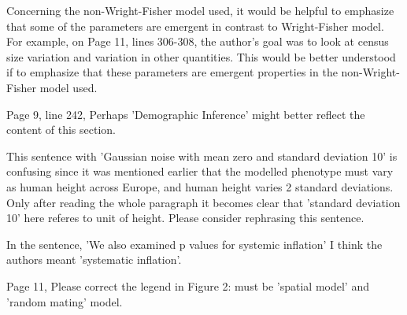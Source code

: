 \begin{point}{}
    Concerning the non-Wright-Fisher model used, it would be helpful to emphasize that some of the parameters are emergent in contrast to Wright-Fisher model. For example, on Page 11, lines 306-308, the author's goal was to look at census size variation and variation in other quantities. This would be better understood if to emphasize that these parameters are emergent properties in the non-Wright-Fisher model used.
\end{point}


\begin{point}{}
    Page 9, line 242, Perhaps 'Demographic Inference' might better reflect the content of this section.
\end{point}


\begin{point}{\revref}
    This sentence with 'Gaussian noise with mean zero and standard deviation 10' is confusing since it was mentioned earlier that the modelled phenotype must vary as human height across Europe, and human height varies 2 standard deviations. Only after reading the whole paragraph it becomes clear that 'standard deviation 10' here referes to unit of height. Please consider rephrasing this sentence.
\end{point}


\begin{point}{\revref}
    In the sentence, 'We also examined p values for systemic inflation' I think the authors meant 'systematic inflation'.
\end{point}


\begin{point}{}
    Page 11, Please correct the legend in Figure 2: must be 'spatial model' and 'random mating' model.
\end{point}


